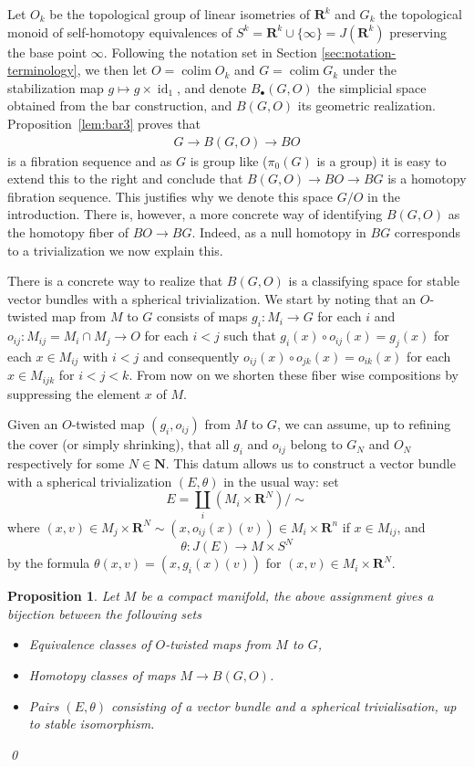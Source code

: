 \documentclass[reqno]{amsart}
\theoremstyle{theorem}
\newtheorem{proposition}[corollary]{Proposition}
\theoremstyle{remark}
\theoremstyle{definition}
\DeclareMathOperator*{\colim}{colim}
\newcommand{\R}{\mathbf{R}}
\newcommand{\N}{\mathbf{N}}
\DeclareMathOperator{\id}{id}
\begin{document}
Let $O_k$ be the topological group of linear isometries of $\R^k$ and $G_k$ the topological monoid
of self-homotopy equivalences of $S^k=\R^k\cup \{\infty\}=J(\R^k)$ preserving the base point $\infty$. Following the notation set in Section \ref{sec:notation-terminology}, we then let $O=\colim O_k$ and $G=\colim G_k$ under the stabilization map $g\mapsto g\times \id_1$, and
denote $B_\bullet(G,O)$ the simplicial space obtained from the bar construction, and  $B(G,O)$ its geometric realization. Proposition~\ref{lem:bar3} proves that
\begin{align*}
  G \to B(G,O) \to BO
\end{align*}
is a fibration sequence and as $G$ is group like ($\pi_0(G)$ is a group) it is easy to extend this to the right and conclude that $B(G,O) \to BO \to BG$ is a homotopy fibration sequence. This justifies why we denote this space $G/O$ in the introduction. There is, however, a more concrete way of identifying $B(G,O)$ as the homotopy fiber of $BO \to BG$. Indeed, as a null homotopy in $BG$ corresponds to a trivialization we now explain this.


There is a concrete way to realize that $B(G,O)$ is a classifying space for stable vector bundles with a spherical trivialization. We start by noting that an $O$-twisted map from $M$ to $G$ consists of
maps $g_i : M_i \to G$ for each $i$ and $o_{ij} : M_{ij}=M_i\cap M_j \to O$ for each $i<j$
such that $g_i(x) \circ o_{ij}(x)=g_j(x)$ for each $x\in M_{ij}$ with $i<j$ and consequently $o_{ij}(x) \circ o_{jk}(x)=o_{ik}(x)$ for each $x\in M_{ijk}$
for $i<j<k$. From now on we shorten these fiber wise compositions by suppressing the element $x$ of $M$.


Given an $O$-twisted map $(g_i,o_{ij})$ from $M$ to $G$,
we can assume, up to refining the cover (or simply shrinking), that
all $g_i$ and $o_{ij}$ belong to $G_N$ and $O_N$ respectively for some $N\in \N$. This datum allows
us to construct a vector bundle with a spherical trivialization $(E,\theta)$ in the usual way:
set 
\[E=\coprod_i(M_i\times \R^N)/\sim \]
where $(x,v)\in M_j\times \R^N \sim (x,o_{ij}(x)(v))\in M_i\times \R^n$ if $x\in M_{ij}$,
and
\[\theta : J(E) \to M \times S^N\]
by the formula $\theta(x,v)=(x,g_i(x)(v))$ for $(x,v)\in M_i \times \R^N$.


\begin{proposition}
Let $M$ be a compact manifold, the above assignment gives a bijection between
the following sets
\begin{itemize}
\item Equivalence classes of $O$-twisted maps from $M$ to $G$,
\item Homotopy classes of maps $M\to B(G,O)$.
\item Pairs $(E,\theta)$ consisting of a vector bundle and a spherical trivialisation, up to stable isomorphism.
\end{itemize} \qed
\end{proposition}
\end{document}
